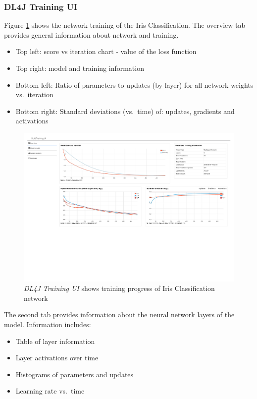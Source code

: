 \subsubsection{DL4J Training UI}\label{dl4j-training-ui}

Figure \ref{usecase_1_ui-training_dl4j} shows the network training of
the Iris Classification. The overview tab provides general information
about network and training.

\begin{itemize}
\tightlist
\item
  Top left: score vs iteration chart - value of the loss function
\item
  Top right: model and training information
\item
  Bottom left: Ratio of parameters to updates (by layer) for all network
  weights vs.~iteration
\item
  Bottom right: Standard deviations (vs.~time) of: updates, gradients
  and activations
\end{itemize}

\cite{dl4j-traininui}

\begin{figure}
\centering
\includegraphics[width=15.00000cm]{images/usecase_1_ui-training_dl4j}
\caption{\emph{DL4J Training UI} shows training progress of Iris
Classification network \label{usecase_1_ui-training_dl4j}}
\end{figure}

The second tab provides information about the neural network layers of
the model. Information includes:

\begin{itemize}
\tightlist
\item
  Table of layer information
\item
  Layer activations over time
\item
  Histograms of parameters and updates
\item
  Learning rate vs.~time
\end{itemize}

